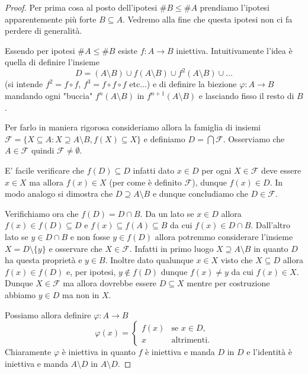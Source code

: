 \documentclass[italian,a4paper,twosides,headinclude]{scrbook}
\renewcommand{\phi}{\varphi}
\renewcommand{\subset}{\subseteq}
\renewcommand{\supset}{\supseteq}
\newcommand{\F}{\mathcal F}
\begin{document}
\begin{proof}
Per prima cosa al posto dell'ipotesi $\# B \le \#A$ prendiamo
l'ipotesi apparentemente più forte $B\subset A$.
Vedremo alla fine che questa ipotesi non ci fa perdere di generalità.

Essendo per ipotesi $\#A \le \#B$ esiste $f\colon A \to B$ iniettiva.
Intuitivamente l'idea è quella di definire l'insieme
\[
 D = (A\setminus B)  \cup f(A\setminus B) \cup f^2(A\setminus B) \cup \dots
\]
(si intende $f^2=f\circ f$, $f^3=f\circ f\circ f$ etc...)
e di definire la biezione $\phi \colon A \to B$ mandando ogni "buccia"
$f^n(A\setminus B)$ in $f^{n+1}(A\setminus B)$ e lasciando fisso
il resto di $B$.

Per farlo in maniera rigorosa
consideriamo allora la famiglia di insiemi $\F = \{X \subset A \colon X \supset A \setminus B, f(X) \subset X\}$ e definiamo $D = \bigcap \F$.
Osserviamo che $A \in \F$ quindi $\F\neq \emptyset$.

E' facile verificare che $f(D) \subset D$ infatti dato $x\in D$ per ogni $X\in \F$ deve essere $x\in X$ ma allora $f(x) \in X$ (per come è definito $\F$), dunque $f(x) \in D$. In modo analogo si dimostra che $D\supset A\setminus B$ e dunque concludiamo che $D\in \F$.

Verifichiamo ora che $f(D)=D\cap B$. Da un lato se $x\in D$ allora
$f(x) \in f(D)\subset D$ e $f(x)\subset f(A)\subset B$ da cui $f(x) \in D\cap B$.
Dall'altro lato se $y\in D \cap B$ e non fosse $y \in f(D)$
allora potremmo considerare l'insieme $X=D\setminus\{y\}$
e osservare che $X\in \F$.
Infatti in primo luogo $X \supset A \setminus B$ in quanto $D$ ha questa proprietà e $y \in B$.
Inoltre dato qualunque $x \in X$ visto che $X\subset D$ allora
$f(x) \in f(D)$ e, per ipotesi,
$y\not \in f(D)$ dunque $f(x)\neq y$ da cui $f(x) \in X$.
Dunque $X\in \F$ ma allora dovrebbe essere $D\subset X$ mentre
per costruzione abbiamo $y\in D$ ma non in $X$.


Possiamo allora definire $\phi \colon A \to B$
\[
\phi(x) =
\begin{cases}
   f(x) & \text{se $x\in D$}, \\
   x & \text{altrimenti.}
\end{cases}
\]
Chiaramente $\phi$ è iniettiva in quanto $f$ è iniettiva e manda $D$ in $D$
e l'identità è iniettiva e manda $A\setminus D$ in $A\setminus D$.


\end{proof}
\end{document}
